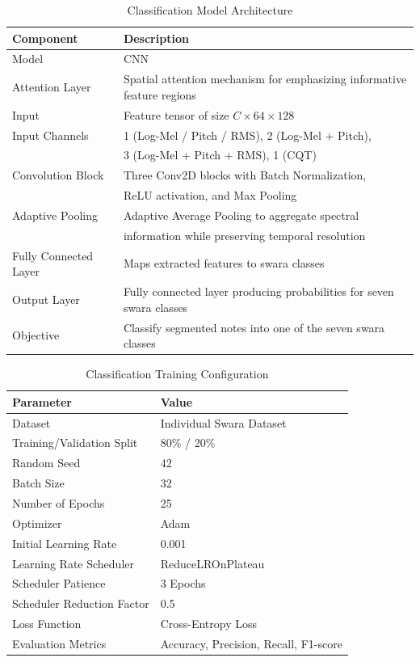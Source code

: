 \begin{table}[H]
\centering
\caption{Classification Model Architecture}
\label{tab:classification-arch}
\begin{tabular}{ll}
\toprule
\textbf{Component} & \textbf{Description} \\
\midrule
Model & CNN \\
Attention Layer & Spatial attention mechanism for emphasizing informative feature regions \\
Input & Feature tensor of size $C \times 64 \times 128$ \\
Input Channels & 1 (Log-Mel / Pitch / RMS), 2 (Log-Mel + Pitch), \\
 & 3 (Log-Mel + Pitch + RMS), 1 (CQT) \\
Convolution Block & Three Conv2D blocks with Batch Normalization, \\
 & ReLU activation, and Max Pooling \\
Adaptive Pooling & Adaptive Average Pooling to aggregate spectral \\
 & information while preserving temporal resolution \\
Fully Connected Layer & Maps extracted features to swara classes \\
Output Layer & Fully connected layer producing probabilities for seven swara classes \\
Objective & Classify segmented notes into one of the seven swara classes \\
\bottomrule
\end{tabular}
\end{table}

\begin{table}[H]
\centering
\caption{Classification Training Configuration}
\label{tab:classification-training}
\begin{tabular}{ll}
\toprule
\textbf{Parameter} & \textbf{Value} \\
\midrule
Dataset & Individual Swara Dataset \\
Training/Validation Split & 80\% / 20\% \\
Random Seed & 42 \\
Batch Size & 32 \\
Number of Epochs & 25 \\
Optimizer & Adam \\
Initial Learning Rate & 0.001 \\
Learning Rate Scheduler & ReduceLROnPlateau \\
Scheduler Patience & 3 Epochs \\
Scheduler Reduction Factor & 0.5 \\
Loss Function & Cross-Entropy Loss \\
Evaluation Metrics & Accuracy, Precision, Recall, F1-score \\
\bottomrule
\end{tabular}
\end{table}

